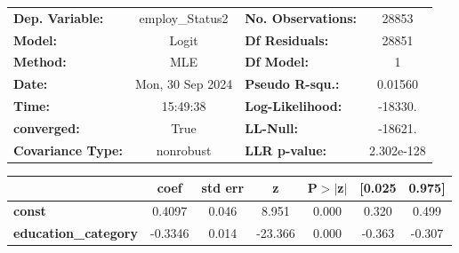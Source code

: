 \begin{center}
\begin{tabular}{lclc}
\toprule
\textbf{Dep. Variable:}      & employ\_Status2  & \textbf{  No. Observations:  } &    28853    \\
\textbf{Model:}              &      Logit       & \textbf{  Df Residuals:      } &    28851    \\
\textbf{Method:}             &       MLE        & \textbf{  Df Model:          } &        1    \\
\textbf{Date:}               & Mon, 30 Sep 2024 & \textbf{  Pseudo R-squ.:     } &  0.01560    \\
\textbf{Time:}               &     15:49:38     & \textbf{  Log-Likelihood:    } &   -18330.   \\
\textbf{converged:}          &       True       & \textbf{  LL-Null:           } &   -18621.   \\
\textbf{Covariance Type:}    &    nonrobust     & \textbf{  LLR p-value:       } & 2.302e-128  \\
\bottomrule
\end{tabular}
\begin{tabular}{lcccccc}
                             & \textbf{coef} & \textbf{std err} & \textbf{z} & \textbf{P$> |$z$|$} & \textbf{[0.025} & \textbf{0.975]}  \\
\midrule
\textbf{const}               &       0.4097  &        0.046     &     8.951  &         0.000        &        0.320    &        0.499     \\
\textbf{education\_category} &      -0.3346  &        0.014     &   -23.366  &         0.000        &       -0.363    &       -0.307     \\
\bottomrule
\end{tabular}
\end{center}